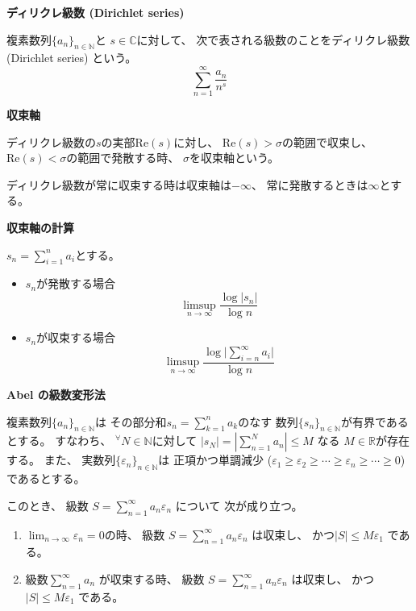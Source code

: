 \documentclass[12pt,b5paper]{ltjsarticle}
\begin{document}
\hrulefill

\textbf{ディリクレ級数 (Dirichlet series)}

複素数列$\{a_{n}\}_{n\in\mathbb{N}}$と
$s\in\mathbb{C}$に対して、
次で表される級数のことをディリクレ級数 (Dirichlet series)
という。
\begin{equation}
 \sum_{n=1}^{\infty}\frac{a_{n}}{n^{s}}
\end{equation}

\textbf{収束軸}

ディリクレ級数の$s$の実部$\mathrm{Re}(s)$に対し、
$\mathrm{Re}(s) > \sigma$の範囲で収束し、
$\mathrm{Re}(s) < \sigma$の範囲で発散する時、
$\sigma$を収束軸という。

ディリクレ級数が常に収束する時は収束軸は$-\infty$、
常に発散するときは$\infty$とする。


\textbf{収束軸の計算}

$s_{n}=\sum_{i=1}^{n}a_{i}$とする。
\begin{itemize}
 \item $s_{n}$が発散する場合
       \begin{equation}
        \limsup_{n\to \infty} \frac{\log{\lvert s_{n} \rvert}}{\log{n}}
       \end{equation}
 \item $s_{n}$が収束する場合
       \begin{equation}
        \limsup_{n\to \infty} \frac{\log{\lvert \sum_{i=n}^{\infty}a_{i} \rvert}}{\log{n}}
       \end{equation}
\end{itemize}



\dotfill

\textbf{Abel の級数変形法}

複素数列$\{a_{n}\}_{n\in\mathbb{N}}$は
その部分和$s_{n}=\sum_{k=1}^{n}a_{k}$のなす
数列$\{s_{n}\}_{n\in\mathbb{N}}$が有界であるとする。
すなわち、
${}^{\forall}N\in\mathbb{N}$に対して
$\lvert s_{N} \rvert = \left\lvert \sum_{n=1}^{N}a_{n} \right\rvert \leq M$
なる
$M\in\mathbb{R}$が存在する。
また、
実数列$\{\varepsilon_{n}\}_{n\in\mathbb{N}}$は
正項かつ単調減少
($\varepsilon_{1}\geq \varepsilon_{2}\geq \cdots \geq \varepsilon_{n}\geq \cdots \geq 0$)
であるとする。

このとき、
級数
$\displaystyle S= \sum_{n=1}^{\infty}a_{n}\varepsilon_{n}$
について
次が成り立つ。
\begin{enumerate}
 \item
      $\lim_{n\to\infty}\varepsilon_{n}=0$の時、
      級数
      $S= \sum_{n=1}^{\infty}a_{n}\varepsilon_{n}$
      は収束し、
      かつ$\lvert S \rvert \leq M\varepsilon_{1}$
      である。
 \item
      級数$\sum_{n=1}^{\infty}a_{n}$
      が収束する時、
      級数
      $S= \sum_{n=1}^{\infty}a_{n}\varepsilon_{n}$
      は収束し、
      かつ$\lvert S \rvert \leq M\varepsilon_{1}$
      である。
\end{enumerate}
\end{document}

